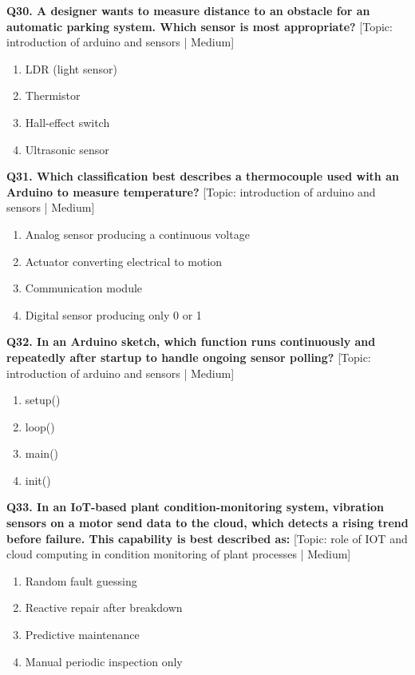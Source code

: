 \noindent\textbf{Q30. A designer wants to measure distance to an obstacle for an automatic parking system. Which sensor is most appropriate?} \hfill [Topic: introduction of arduino and sensors | Medium]
\begin{enumerate}[label=(\alph*),topsep=2pt,itemsep=1pt,partopsep=0pt,parsep=0pt]
    \item {LDR (light sensor)}
    \item {Thermistor}
    \item {Hall-effect switch}
    \item {Ultrasonic sensor}
\end{enumerate}
\vspace{2mm}

\noindent\textbf{Q31. Which classification best describes a thermocouple used with an Arduino to measure temperature?} \hfill [Topic: introduction of arduino and sensors | Medium]
\begin{enumerate}[label=(\alph*),topsep=2pt,itemsep=1pt,partopsep=0pt,parsep=0pt]
    \item {Analog sensor producing a continuous voltage}
    \item {Actuator converting electrical to motion}
    \item {Communication module}
    \item {Digital sensor producing only 0 or 1}
\end{enumerate}
\vspace{2mm}

\noindent\textbf{Q32. In an Arduino sketch, which function runs continuously and repeatedly after startup to handle ongoing sensor polling?} \hfill [Topic: introduction of arduino and sensors | Medium]
\begin{enumerate}[label=(\alph*),topsep=2pt,itemsep=1pt,partopsep=0pt,parsep=0pt]
    \item {setup()}
    \item {loop()}
    \item {main()}
    \item {init()}
\end{enumerate}
\vspace{2mm}

\noindent\textbf{Q33. In an IoT-based plant condition-monitoring system, vibration sensors on a motor send data to the cloud, which detects a rising trend before failure. This capability is best described as:} \hfill [Topic: role of IOT and cloud computing in condition monitoring of plant processes | Medium]
\begin{enumerate}[label=(\alph*),topsep=2pt,itemsep=1pt,partopsep=0pt,parsep=0pt]
    \item {Random fault guessing}
    \item {Reactive repair after breakdown}
    \item {Predictive maintenance}
    \item {Manual periodic inspection only}
\end{enumerate}
\vspace{2mm}

